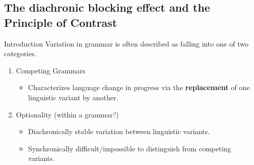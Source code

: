 \documentclass[hyperref={pdfpagelabels=false}]{beamer}
\begin{document}
\subsection{The diachronic blocking effect and the Principle of Contrast}

\begin{frame}{Introduction}
	Variation in grammar is often described as falling into one of two categories.
	
	\begin{enumerate}
		\item Competing Grammars \citep{kroch1989}
		\begin{itemize}
			\item Characterizes language change in progress via the \textbf{replacement} of one linguistic variant by another.
		\end{itemize}
		\item Optionality (within a grammar?)
		\begin{itemize}
			\item Diachronically stable variation between linguistic variants.
			\item Synchronically difficult/impossible to distinguish from competing variants.
		\end{itemize}
	\end{enumerate}
	
\end{frame}
\end{document}
